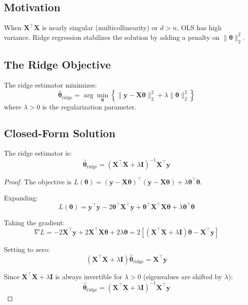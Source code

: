 \documentclass[main.tex]{subfiles}
\begin{document}
\subsection{Motivation}

When $\mathbf{X}^\top\mathbf{X}$ is nearly singular (multicollinearity) or $d > n$, OLS has high variance. Ridge regression stabilizes the solution by adding a penalty on $\|\boldsymbol{\theta}\|_2^2$.

\subsection{The Ridge Objective}

\begin{definition}
The ridge estimator minimizes:
$$\hat{\boldsymbol{\theta}}_{\text{ridge}} = \arg\min_{\boldsymbol{\theta}} \left\{ \|\mathbf{y} - \mathbf{X}\boldsymbol{\theta}\|_2^2 + \lambda\|\boldsymbol{\theta}\|_2^2 \right\}$$
where $\lambda > 0$ is the regularization parameter.
\end{definition}

\subsection{Closed-Form Solution}

\begin{theorem}
The ridge estimator is:
$$\boxed{\hat{\boldsymbol{\theta}}_{\text{ridge}} = (\mathbf{X}^\top\mathbf{X} + \lambda\mathbf{I})^{-1}\mathbf{X}^\top\mathbf{y}}$$
\end{theorem}

\begin{proof}
The objective is $L(\boldsymbol{\theta}) = (\mathbf{y} - \mathbf{X}\boldsymbol{\theta})^\top(\mathbf{y} - \mathbf{X}\boldsymbol{\theta}) + \lambda\boldsymbol{\theta}^\top\boldsymbol{\theta}$.

Expanding:
$$L(\boldsymbol{\theta}) = \mathbf{y}^\top\mathbf{y} - 2\boldsymbol{\theta}^\top\mathbf{X}^\top\mathbf{y} + \boldsymbol{\theta}^\top\mathbf{X}^\top\mathbf{X}\boldsymbol{\theta} + \lambda\boldsymbol{\theta}^\top\boldsymbol{\theta}$$

Taking the gradient:
$$\nabla L = -2\mathbf{X}^\top\mathbf{y} + 2\mathbf{X}^\top\mathbf{X}\boldsymbol{\theta} + 2\lambda\boldsymbol{\theta} = 2\left[(\mathbf{X}^\top\mathbf{X} + \lambda\mathbf{I})\boldsymbol{\theta} - \mathbf{X}^\top\mathbf{y}\right]$$

Setting to zero:
$$(\mathbf{X}^\top\mathbf{X} + \lambda\mathbf{I})\hat{\boldsymbol{\theta}}_{\text{ridge}} = \mathbf{X}^\top\mathbf{y}$$

Since $\mathbf{X}^\top\mathbf{X} + \lambda\mathbf{I}$ is always invertible for $\lambda > 0$ (eigenvalues are shifted by $\lambda$):
$$\hat{\boldsymbol{\theta}}_{\text{ridge}} = (\mathbf{X}^\top\mathbf{X} + \lambda\mathbf{I})^{-1}\mathbf{X}^\top\mathbf{y}$$
\end{proof}
\end{document}
